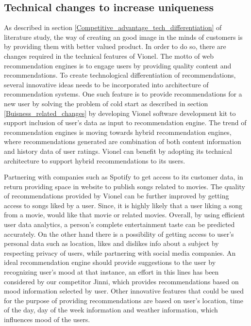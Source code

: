  \subsection {Technical changes to increase uniqueness} 
  \label{Technical_changes_to_increase_uniqueness}
    As described in section \ref{Competitive_advantage_tech_differentiation} of literature study, the way of creating an good image in the minds of customers is by providing them with better valued product. In order to do so, there are changes required in the technical features of Vionel. The motto of web recommendation engines is to engage users by providing quality content and recommendations. To create technological differentiation of recommendations, several innovative ideas needs to be incorporated into architecture of recommendation systems. One such feature is to provide recommendations for a new user by solving the problem of cold start as described in section \ref{Buisness_related_changes} by developing Vionel software development kit to support inclusion of user's data as input to recommendation engine. The trend of recommendation engines is moving towards hybrid recommendation engines, where recommendations generated are combination of both content information and history data of user ratings. Vionel can benefit by adopting its technical architecture to support hybrid recommendations to its users. 

    Partnering with companies such as Spotify to get access to its customer data, in return providing space in website to publish songs related to movies. The quality of recommendations provided by Vionel can be further improved by getting access to songs liked by a user. Since, it is highly likely that a user liking a song from a movie, would like that movie or related movies. Overall, by using efficient user data analytics, a person's complete entertainment taste can be predicted accurately. On the other hand there is a possibility of getting access to user's personal data such as location, likes and dislikes info about a subject by respecting privacy of users, while partnering with social media companies. An ideal recommendation engine should provide suggestions to the user by recognizing user's mood at that instance, an effort in this lines has been considered by our competitor Jinni, which provides recommendations based on mood information selected by user. Other innovative features that could be used for the purpose of providing recommendations are based on user's location, time of the day, day of the week information and weather information, which influences mood of the users. 

